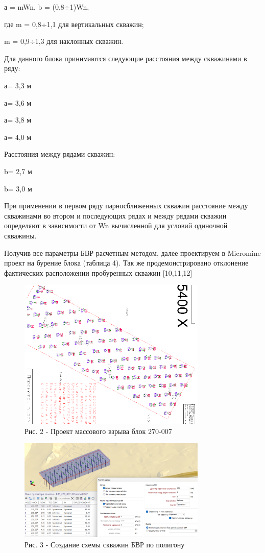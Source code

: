 \begin{multicols}{2}
а = mWn, b = (0,8÷1)Wn,

где m = 0,8÷1,1 для вертикальных скважин;

m = 0,9÷1,3 для наклонных скважин.

Для данного блока принимаются следующие расстояния между скважинами в
ряду:

а= 3,3 м

а= 3,6 м

а= 3,8 м

а= 4,0 м

Расстояния между рядами скважин:

b= 2,7 м

b= 3,0 м

При применении в первом ряду парносближенных скважин расстояние между
скважинами во втором и последующих рядах и между рядами скважин
определяют в зависимости от Wn вычисленной для условий одиночной
скважины.

Получив все параметры БВР расчетным методом, далее проектируем в
Micromine проект на бурение блока (таблица 4). Так же продемонстрировано
отклонение фактических расположении пробуренных скважин {[}10,11,12{]}
\end{multicols}


\begin{figure}[H]
	\centering
	\includegraphics[width=0.8\textwidth]{media/gor/image29}
	\caption*{Рис. 2 - Проект массового взрыва блок 270-007}
\end{figure}


\begin{figure}[H]
	\centering
	\includegraphics[width=0.8\textwidth]{media/gor/image30}
	\caption*{Рис. 3 - Создание схемы скважин БВР по полигону}
\end{figure}


